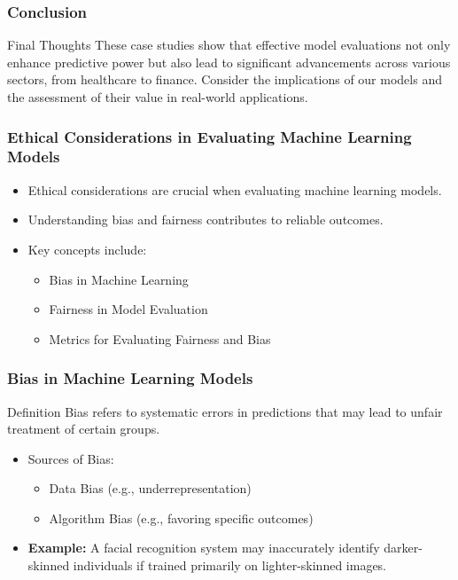 \documentclass[aspectratio=169]{beamer}
\begin{document}
\begin{frame}[fragile]
    \frametitle{Conclusion}
    
    \begin{block}{Final Thoughts}
        These case studies show that effective model evaluations not only enhance predictive power but also lead to significant advancements across various sectors, from healthcare to finance.
        Consider the implications of our models and the assessment of their value in real-world applications.
    \end{block}
\end{frame}

\begin{frame}
    \frametitle{Ethical Considerations in Evaluating Machine Learning Models}
    \begin{itemize}
        \item Ethical considerations are crucial when evaluating machine learning models.
        \item Understanding bias and fairness contributes to reliable outcomes.
        \item Key concepts include:
        \begin{itemize}
            \item Bias in Machine Learning
            \item Fairness in Model Evaluation
            \item Metrics for Evaluating Fairness and Bias
        \end{itemize}
    \end{itemize}
\end{frame}

\begin{frame}
    \frametitle{Bias in Machine Learning Models}
    \begin{block}{Definition}
        Bias refers to systematic errors in predictions that may lead to unfair treatment of certain groups.
    \end{block}
    \begin{itemize}
        \item Sources of Bias:
        \begin{itemize}
            \item Data Bias (e.g., underrepresentation)
            \item Algorithm Bias (e.g., favoring specific outcomes)
        \end{itemize}
        \item \textbf{Example:} A facial recognition system may inaccurately identify darker-skinned individuals if trained primarily on lighter-skinned images.
    \end{itemize}
\end{frame}
\end{document}
